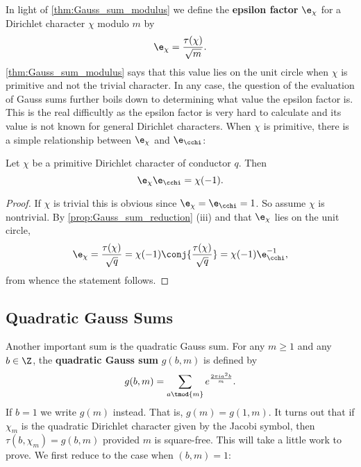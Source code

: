         In light of \cref{thm:Gauss_sum_modulus} we define the \textbf{epsilon factor} $\e_{\chi}$ for a Dirichlet character $\chi$ modulo $m$ by
        \[
          \e_{\chi} = \frac{\tau(\chi)}{\sqrt{m}}.
        \]
        \cref{thm:Gauss_sum_modulus} says that this value lies on the unit circle when $\chi$ is primitive and not the trivial character. In any case, the question of the evaluation of Gauss sums further boils down to determining what value the epsilon factor is. This is the real difficultly as the epsilon factor is very hard to calculate and its value is not known for general Dirichlet characters. When $\chi$ is primitive, there is a simple relationship between $\e_{\chi}$ and $\e_{\cchi}$:

        \begin{proposition}\label{prop:epsilon_factor_relationship}
          Let $\chi$ be a primitive Dirichlet character of conductor $q$. Then
          \[
            \e_{\chi}\e_{\cchi} = \chi(-1).
          \]
        \end{proposition}
        \begin{proof}
          If $\chi$ is trivial this is obvious since $\e_{\chi} = \e_{\cchi} = 1$. So assume $\chi$ is nontrivial. By \cref{prop:Gauss_sum_reduction} (iii) and that $\e_{\chi}$ lies on the unit circle,
          \[
            \e_{\chi} = \frac{\tau(\chi)}{\sqrt{q}} = \chi(-1)\conj{\frac{\tau(\chi)}{\sqrt{q}}} = \chi(-1)\e_{\cchi}^{-1},
          \]
          from whence the statement follows.
        \end{proof}
      \subsection*{Quadratic Gauss Sums}
        Another important sum is the quadratic Gauss sum. For any $m \ge 1$ and any $b \in \Z$, the \textbf{quadratic Gauss sum} $g(b,m)$ is defined by
        \[
          g(b,m) = \sum_{a \tmod{m}}e^{\frac{2\pi ia^{2}b}{m}}.
        \]
        If $b = 1$ we write $g(m)$ instead. That is, $g(m) = g(1,m)$. It turns out that if $\chi_{m}$ is the quadratic Dirichlet character given by the Jacobi symbol, then $\tau(b,\chi_{m}) = g(b,m)$ provided $m$ is square-free. This will take a little work to prove. We first reduce to the case when $(b,m) = 1$:

